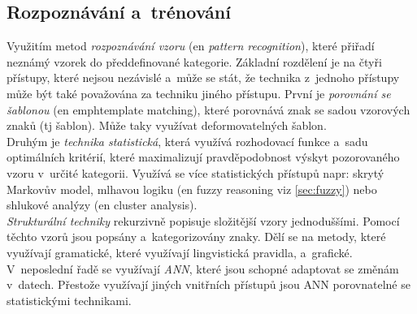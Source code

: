 \documentclass[12pt,oneside]{report}			%
\begin{document}
	\subsection{Rozpoznávání a~trénování}	
	Využitím metod \emph{rozpoznávání vzoru} (\gls{en} \emph{pattern recognition}), které přiřadí neznámý vzorek do předdefinované kategorie. Základní rozdělení je na čtyři přístupy, které nejsou nezávislé a~může se stát, že technika z~jednoho přístupy může být také považována za techniku jiného přístupu. První je \emph{porovnání se šablonou} (\gls{en} emph{template matching}), které porovnává znak se sadou vzorových znaků (\gls{tj} šablon). Může taky využívat deformovatelných šablon. \parencite[\gls{s} 29-34]{chaudhuri2017optical}\\
	Druhým je \emph{technika statistická}, která využívá rozhodovací funkce a~sadu optimálních kritérií, které maximalizují pravděpodobnost výskyt pozorovaného vzoru v~určité kategorii. Využívá se více statistických přístupů \gls{napr}: skrytý Markovův model, mlhavou logiku (\gls{en} fuzzy reasoning \gls{viz} \ref{sec:fuzzy}) nebo shlukové analýzy (\gls{en} cluster analysis). \parencite[\gls{s} 29-34]{chaudhuri2017optical}\\
	\emph{Strukturální techniky} rekurzivně popisuje složitější vzory jednoduššími. Pomocí těchto vzorů jsou popsány a~kategorizovány znaky. Dělí se na metody, které využívají gramatické, které využívají lingvistická pravidla, a~grafické.
	V~neposlední řadě se využívají \emph{\gls{ANN}}, které jsou schopné adaptovat se změnám v~datech. Přestože využívají jiných vnitřních přístupů jsou \gls{ANN} porovnatelné se statistickými technikami. \parencite[\gls{s} 29-34]{chaudhuri2017optical}
\end{document}
